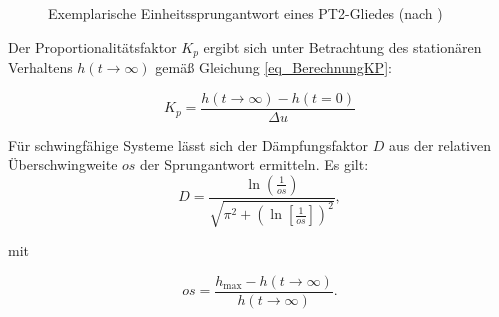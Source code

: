 \begin{figure}[h!]
    \centering
    \setlength{\fboxsep}{1pt}
    \setlength{\fboxrule}{1pt}
    \caption[Exemplarische Einheitssprungantwort eines PT2-Gliedes]{Exemplarische Einheitssprungantwort eines PT2-Gliedes (nach \cite[S.60]{ProfMueller})}
    \label{fig_SprungantwortSymbolisch}
\end{figure}

Der Proportionalitätsfaktor $K_p$ ergibt sich unter Betrachtung des stationären Verhaltens $h(t\rightarrow \infty)$ gemäß Gleichung \ref{eq_BerechnungKP}:

\begin{equation} \label{eq_BerechnungKP}
    K_p = \frac{h(t\rightarrow \infty) - h(t=0)}{\Delta u}
\end{equation}

Für schwingfähige Systeme lässt sich der Dämpfungsfaktor $D$ aus der relativen Überschwingweite $os$ der Sprungantwort ermitteln.
Es gilt:
\begin{equation} \label{eq_BerechnungD}
    D = \frac{\ln \left(\frac{1}{os}\right)}{\sqrt{\pi^2+\left(\ln\left[\frac{1}{os}\right]\right)^2}},
\end{equation}

\vspace*{-\baselineskip}mit

\begin{equation} \label{eq_overshoot}
    os = \frac{h_{\mathrm{max}}-h(t\rightarrow \infty)}{h(t\rightarrow \infty)}.
\end{equation}

